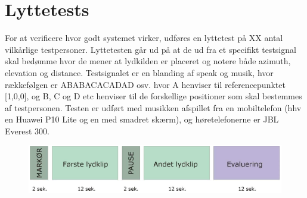 \section{Lyttetests}

For at verificere hvor godt systemet virker, udføres en lyttetest på XX  antal vilkårlige testpersoner. Lyttetesten går ud på at de ud fra et specifikt testsignal skal bedømme hvor de mener at lydkilden er placeret og notere både azimuth, elevation og distance. Testsignalet er en blanding af speak og musik, hvor rækkefølgen er ABABACACADAD osv. hvor A henviser til referencepunktet [1,0,0], og B, C og D etc henviser til de forskellige positioner som skal bestemmes af testpersonen.
Testen er udført med musikken afspillet fra en mobiltelefon (hhv en Huawei P10 Lite og en  med smadret skærm), og høretelefonerne er JBL Everest 300. 

\begin{figure}
	\centering
	\includegraphics[width=0.7\linewidth]{All_Pics/ABtest}
	\caption{}
	\label{fig:abtest}
\end{figure}
